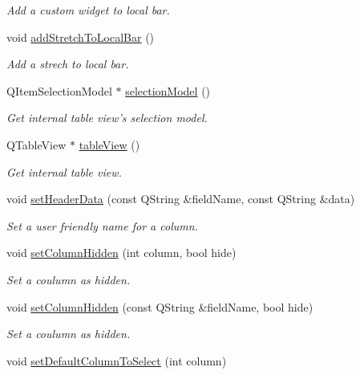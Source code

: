 \begin{DoxyCompactItemize}
\begin{DoxyCompactList}\small\item\em Add a custom widget to local bar. \end{DoxyCompactList}\item 
void \hyperlink{classmdt_sql_table_widget_a6cf9f08b98dd3df16d36c29db7175633}{add\-Stretch\-To\-Local\-Bar} ()
\begin{DoxyCompactList}\small\item\em Add a strech to local bar. \end{DoxyCompactList}\item 
Q\-Item\-Selection\-Model $\ast$ \hyperlink{classmdt_sql_table_widget_a47fc691f2cd9cc40749c987ce2bbea6d}{selection\-Model} ()
\begin{DoxyCompactList}\small\item\em Get internal table view's selection model. \end{DoxyCompactList}\item 
Q\-Table\-View $\ast$ \hyperlink{classmdt_sql_table_widget_af40eeb001ec262830daba6b311927ede}{table\-View} ()
\begin{DoxyCompactList}\small\item\em Get internal table view. \end{DoxyCompactList}\item 
void \hyperlink{classmdt_sql_table_widget_a591461ee19f22008a5c310609461081e}{set\-Header\-Data} (const Q\-String \&field\-Name, const Q\-String \&data)
\begin{DoxyCompactList}\small\item\em Set a user friendly name for a column. \end{DoxyCompactList}\item 
void \hyperlink{classmdt_sql_table_widget_a466ff75bee2a0efd99c62994f65a5d18}{set\-Column\-Hidden} (int column, bool hide)
\begin{DoxyCompactList}\small\item\em Set a coulumn as hidden. \end{DoxyCompactList}\item 
void \hyperlink{classmdt_sql_table_widget_ae1eefd42d91ea36fa4244d7f265d7222}{set\-Column\-Hidden} (const Q\-String \&field\-Name, bool hide)
\begin{DoxyCompactList}\small\item\em Set a coulumn as hidden. \end{DoxyCompactList}\item 
void \hyperlink{classmdt_sql_table_widget_a6c54d9c26f7bb6241607785586bcc52e}{set\-Default\-Column\-To\-Select} (int column)

\end{DoxyCompactItemize}
